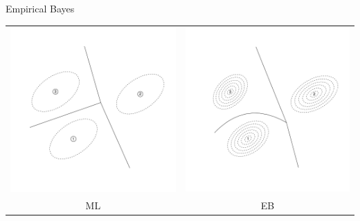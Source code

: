 \documentclass[final]{beamer}
\newlength{\onecolwid}
\begin{document}
\begin{frame}[t]
\begin{columns}[t]
\begin{column}{\onecolwid}
\begin{block}{Empirical Bayes}
\begin{center}
\begin{tabular}{cc}
\includegraphics[scale = 0.5]{illus1_A.pdf} & 
\includegraphics[scale = 0.5]{illus1_B.pdf}\\
ML & EB
\end{tabular}
\end{center}
\end{block}


\end{column}
\end{columns}
\end{frame}
\end{document}
